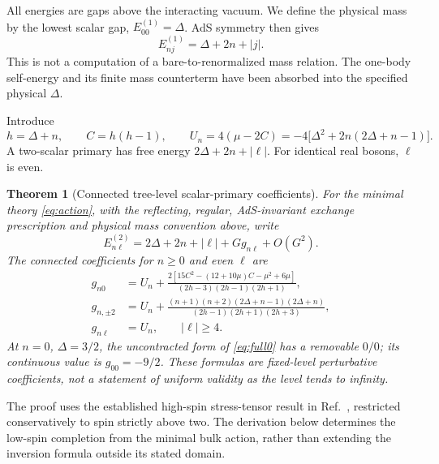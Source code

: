 \documentclass[11pt,a4paper]{article}
\numberwithin{equation}{section}
\newtheorem{theorem}{Theorem}[section]
\theoremstyle{remark}\newtheorem{remark}[theorem]{Remark}
\begin{document}
All energies are gaps above the interacting vacuum. We define the physical mass by the lowest scalar gap, $E^{(1)}_{00}=\Delta$. AdS symmetry then gives
\begin{equation}
 E^{(1)}_{nj}=\Delta+2n+|j|.
 \label{eq:oneparticle}
\end{equation}
This is not a computation of a bare-to-renormalized mass relation. The one-body self-energy and its finite mass counterterm have been absorbed into the specified physical $\Delta$.

Introduce
\begin{equation}
 h=\Delta+n,\qquad C=h(h-1),\qquad
 U_n=4(\mu-2C)=-4\bigl[\Delta^2+2n(2\Delta+n-1)\bigr].
 \label{eq:U}
\end{equation}
A two-scalar primary has free energy $2\Delta+2n+|\ell|$. For identical real bosons, $\ell$ is even.

\begin{theorem}[Connected tree-level scalar-primary coefficients]
\label{thm:main}
For the minimal theory \eqref{eq:action}, with the reflecting, regular, AdS-invariant exchange prescription and physical mass convention above, write
\begin{equation}
 E^{(2)}_{n\ell}=2\Delta+2n+|\ell|+Gg_{n\ell}+O(G^2).
\end{equation}
The connected coefficients for $n\geq0$ and even $\ell$ are
\begin{align}
 g_{n0}&=U_n+
 \frac{2\left[15C^2-(12+10\mu)C-\mu^2+6\mu\right]}
 {(2h-3)(2h-1)(2h+1)},\label{eq:full0}\\
 g_{n,\pm2}&=U_n+
 \frac{(n+1)(n+2)(2\Delta+n-1)(2\Delta+n)}
 {(2h-1)(2h+1)(2h+3)},\label{eq:full2}\\
 g_{n\ell}&=U_n,\qquad |\ell|\geq4.\label{eq:fullhigh}
\end{align}
At $n=0$, $\Delta=3/2$, the uncontracted form of \eqref{eq:full0} has a removable $0/0$; its continuous value is $g_{00}=-9/2$. These formulas are fixed-level perturbative coefficients, not a statement of uniform validity as the level tends to infinity.
\end{theorem}

The proof uses the established high-spin stress-tensor result in Ref.~\cite{KSS}, restricted conservatively to spin strictly above two. The derivation below determines the low-spin completion from the minimal bulk action, rather than extending the inversion formula outside its stated domain.
\end{document}
